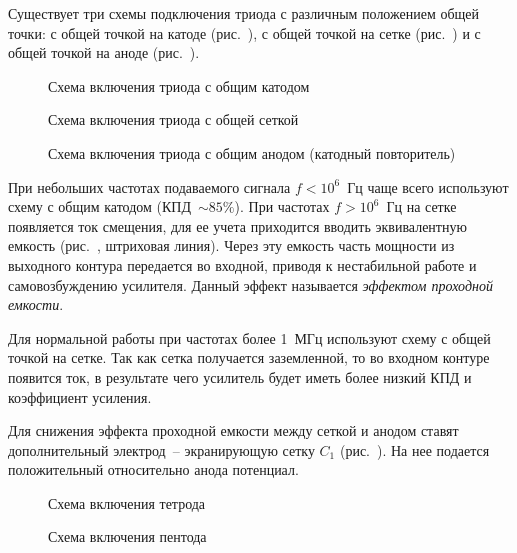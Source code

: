 

Существует три схемы подключения триода с различным положением общей точки: с
общей точкой на катоде (рис.~), с общей точкой на сетке
(рис.~) и с общей точкой на аноде (рис.~).
\begin{figure}[h!]
  \center
  \parbox{.3\textwidth}{\caption{Схема включения триода с общим катодом}
    \label{pic22cc}} \hspace{1em}
  \parbox{.3\textwidth}{\caption{Схема включения триода с общей сеткой}
    \label{pic22cg}} \hspace{1em}
  \parbox{.3\textwidth}{\caption{Схема включения триода с общим анодом (катодный
    повторитель)} \label{pic22ca}}
\end{figure}

При небольших частотах подаваемого сигнала \( f < 10^6 \)~Гц чаще всего
используют схему с общим катодом (КПД~\( \sim 85\% \)). При частотах
\( f > 10^6 \)~Гц на сетке появляется ток смещения, для ее учета приходится
вводить эквивалентную емкость (рис.~, штриховая линия). Через эту
емкость часть мощности из выходного контура передается во входной, приводя к
нестабильной работе и самовозбуждению усилителя. Данный эффект называется
\emph{эффектом проходной емкости}.

Для нормальной работы при частотах более 1~МГц используют схему с общей точкой
на сетке. Так как сетка получается заземленной, то во входном контуре появится
ток, в результате чего усилитель будет иметь более низкий КПД и коэффициент
усиления.

Для снижения эффекта проходной емкости между сеткой и анодом ставят
дополнительный электрод~-- экранирующую сетку \( C_1 \) (рис.~).
На нее подается положительный относительно анода потенциал.

\begin{figure}[hb!]
  \center
  \parbox{.3\textwidth}{\caption{Схема включения тетрода} \label{pic22tetrode}}
    \hspace{1em}
  \parbox{.3\textwidth}{\caption{Схема включения пентода} \label{pic22pentode}}
\end{figure}

